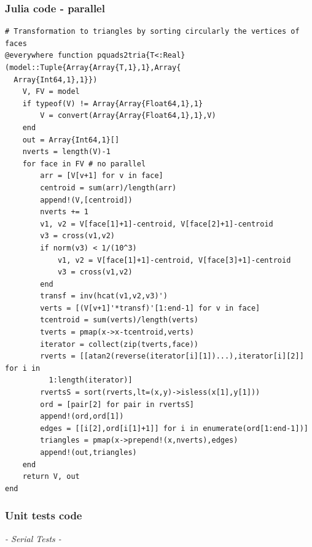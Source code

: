 \documentclass[a4paper,12pt,titlepage]{article}					%
\begin{document}
\subsubsection{Julia code - parallel}
\begin{Verbatim}
# Transformation to triangles by sorting circularly the vertices of faces
@everywhere function pquads2tria{T<:Real}(model::Tuple{Array{Array{T,1},1},Array{
  Array{Int64,1},1}})
	V, FV = model
	if typeof(V) != Array{Array{Float64,1},1}
		V = convert(Array{Array{Float64,1},1},V)
	end
	out = Array{Int64,1}[]
	nverts = length(V)-1
	for face in FV # no parallel
		arr = [V[v+1] for v in face]
		centroid = sum(arr)/length(arr)
		append!(V,[centroid])
		nverts += 1
		v1, v2 = V[face[1]+1]-centroid, V[face[2]+1]-centroid
		v3 = cross(v1,v2)
		if norm(v3) < 1/(10^3)
			v1, v2 = V[face[1]+1]-centroid, V[face[3]+1]-centroid
			v3 = cross(v1,v2)
		end
		transf = inv(hcat(v1,v2,v3)')
		verts = [(V[v+1]'*transf)'[1:end-1] for v in face]
		tcentroid = sum(verts)/length(verts)
		tverts = pmap(x->x-tcentroid,verts)
		iterator = collect(zip(tverts,face))
		rverts = [[atan2(reverse(iterator[i][1])...),iterator[i][2]] for i in
		  1:length(iterator)]
		rvertsS = sort(rverts,lt=(x,y)->isless(x[1],y[1]))
		ord = [pair[2] for pair in rvertsS]
		append!(ord,ord[1])
		edges = [[i[2],ord[i[1]+1]] for i in enumerate(ord[1:end-1])]
		triangles = pmap(x->prepend!(x,nverts),edges)
		append!(out,triangles)
	end
	return V, out
end
\end{Verbatim}

\subsubsection{Unit tests code}
\emph{- Serial Tests -}
\end{document}
